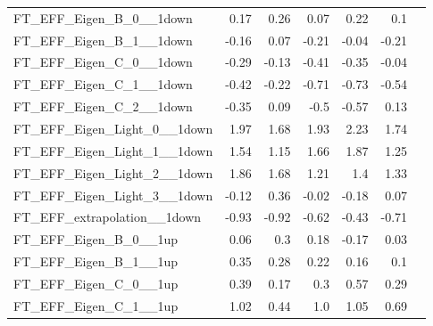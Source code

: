 \begin{table}[htbp]
{\begin{tabular}{lrrrrrr}
FT\_EFF\_Eigen\_B\_0\_\_1down      & 0.17               & 0.26                 & 0.07                 & 0.22                 & 0.1                  \\
FT\_EFF\_Eigen\_B\_1\_\_1down      & -0.16              & 0.07                 & -0.21                & -0.04                & -0.21                \\
FT\_EFF\_Eigen\_C\_0\_\_1down      & -0.29              & -0.13                & -0.41                & -0.35                & -0.04                \\
FT\_EFF\_Eigen\_C\_1\_\_1down      & -0.42              & -0.22                & -0.71                & -0.73                & -0.54                \\
FT\_EFF\_Eigen\_C\_2\_\_1down      & -0.35              & 0.09                 & -0.5                 & -0.57                & 0.13                 \\
FT\_EFF\_Eigen\_Light\_0\_\_1down  & 1.97               & 1.68                 & 1.93                 & 2.23                 & 1.74                 \\
FT\_EFF\_Eigen\_Light\_1\_\_1down  & 1.54               & 1.15                 & 1.66                 & 1.87                 & 1.25                 \\
FT\_EFF\_Eigen\_Light\_2\_\_1down  & 1.86               & 1.68                 & 1.21                 & 1.4                  & 1.33                 \\
FT\_EFF\_Eigen\_Light\_3\_\_1down  & -0.12              & 0.36                 & -0.02                & -0.18                & 0.07                 \\
FT\_EFF\_extrapolation\_\_1down    & -0.93              & -0.92                & -0.62                & -0.43                & -0.71                \\
FT\_EFF\_Eigen\_B\_0\_\_1up        & 0.06               & 0.3                  & 0.18                 & -0.17                & 0.03                 \\
FT\_EFF\_Eigen\_B\_1\_\_1up        & 0.35               & 0.28                 & 0.22                 & 0.16                 & 0.1                  \\
FT\_EFF\_Eigen\_C\_0\_\_1up        & 0.39               & 0.17                 & 0.3                  & 0.57                 & 0.29                 \\
FT\_EFF\_Eigen\_C\_1\_\_1up        & 1.02               & 0.44                 & 1.0                  & 1.05                 & 0.69                 \\

\end{tabular}}
\end{table}
